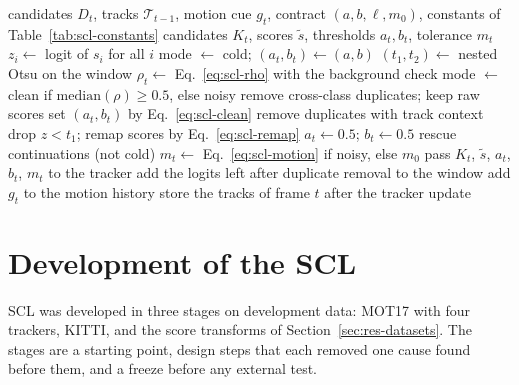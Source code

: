 \begin{algorithm}[tbp]
\caption{SCL for frame $t$. The window holds the logits of frames $t-W$ to $t-1$, so the decision for frame $t$ uses no future frame.}\label{alg:scl-layer}
\begin{algorithmic}[1]
\Require candidates $D_t$, tracks $\mathcal{T}_{t-1}$, motion cue $g_t$, contract $(a,b,\ell,m_0)$, constants of Table~\ref{tab:scl-constants}
\Ensure candidates $K_t$, scores $\tilde{s}$, thresholds $a_t,b_t$, tolerance $m_t$
\State $z_i\gets$ logit of $s_i$ for all $i$ 
 
  \State mode $\gets$ cold; $(a_t,b_t)\gets(a,b)$
\Else
  \State $(t_1,t_2)\gets$ nested Otsu on the window 
  \State $\rho_t\gets$ Eq.~\eqref{eq:scl-rho} with the background check
  \State mode $\gets$ clean if $\mathrm{median}(\rho)\ge0.5$, else noisy
\EndIf
{} 
  \State remove cross-class duplicates; keep raw scores
   set $(a_t,b_t)$ by Eq.~\eqref{eq:scl-clean}
  \EndIf
\Else {}
  \State remove duplicates with track context
  \State drop $z<t_1$; remap scores by Eq.~\eqref{eq:scl-remap}
  \State $a_t\gets0.5$; $b_t\gets0.5$
\EndIf
\State rescue continuations (not cold) 
\State $m_t\gets$ Eq.~\eqref{eq:scl-motion} if noisy, else $m_0$
\State pass $K_t$, $\tilde{s}$, $a_t$, $b_t$, $m_t$ to the tracker
\State add the logits left after duplicate removal to the window
\State add $g_t$ to the motion history
\State store the tracks of frame $t$ after the tracker update
\end{algorithmic}
\end{algorithm}

\section{Development of the SCL}\label{sec:scl-dev}
SCL was developed in three stages on development data: MOT17 with four trackers, KITTI, and the score transforms of Section~\ref{sec:res-datasets}. The stages are a starting point, design steps that each removed one cause found before them, and a freeze before any external test.

